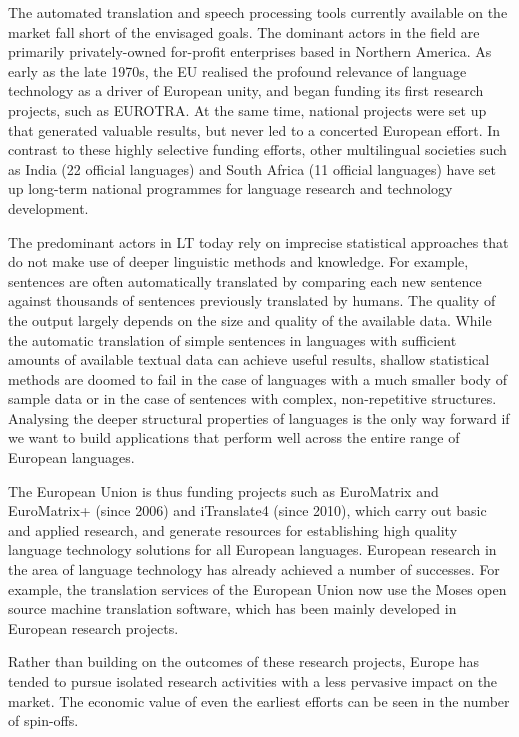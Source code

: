 \begin{multicols}{2}
  The automated translation and speech processing tools currently available on the market fall short of the envisaged goals. The dominant actors in the field are primarily privately-owned for-profit enterprises based in Northern America. As early as the late 1970s, the EU realised the profound relevance of language technology as a driver of European unity, and began funding its first research projects, such as EUROTRA. At the same time, national projects were set up that generated valuable results, but never led to a concerted European effort. In contrast to these highly selective funding efforts, other multilingual societies such as India (22 official languages) and South Africa (11 official languages) have set up long-term national programmes for language research and technology development. 

  The predominant actors in LT today rely on imprecise statistical approaches that do not make use of deeper linguistic methods and knowledge. For example, sentences are often automatically translated by comparing each new sentence against thousands of sentences previously translated by humans. The quality of the output largely depends on the size and quality of the available  data. While the automatic translation of simple sentences in languages with sufficient amounts of available textual data can achieve useful results, shallow statistical methods are doomed to fail in the case of languages with a much smaller body of sample data or in the case of sentences with complex, non-repetitive structures. Analysing the deeper structural properties of languages is the only way forward if we want to build applications that perform well across the entire range of European languages.


  The European Union is thus funding projects such as EuroMatrix and EuroMatrix+ (since 2006) and iTranslate4 (since 2010), which carry out basic and applied research, and generate resources for establishing high quality language technology solutions for all European languages. 
  European research in the area of language technology has already achieved a number of successes. For example, the translation services of the European Union now use the Moses open source machine translation software, which has been mainly developed in European research projects. 

  Rather than building on the outcomes of these research projects, Europe has tended to pursue isolated research activities with a less pervasive impact on the market. The economic value of even the earliest efforts can be seen in the number of spin-offs. 


\end{multicols}
